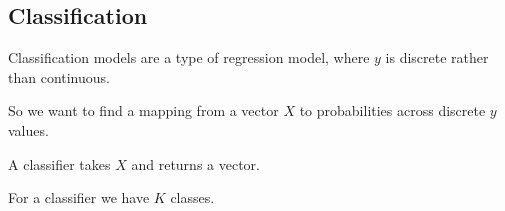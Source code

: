 
\subsection{Classification}

Classification models are a type of regression model, where \(y\) is discrete rather than continuous.

So we want to find a mapping from a vector \(X\) to probabilities across discrete \(y\) values.

A classifier takes \(X\) and returns a vector.

For a classifier we have \(K\) classes. 

